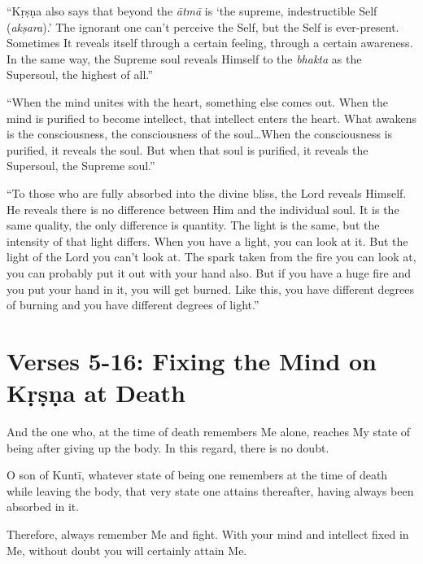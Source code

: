 \enquote{Kṛṣṇa also says that beyond the \textit{ātmā} is \enquote{the supreme, indestructible Self (\textit{akṣara}).} The ignorant one can’t perceive the Self, but the Self is ever-present. Sometimes It reveals itself through a certain feeling, through a certain awareness. In the same way, the Supreme soul reveals Himself to the \textit{bhakta} as the Supersoul, the highest of all.}

\enquote{When the mind unites with the heart, something else comes out. When the mind is purified to become intellect, that intellect enters the heart. What awakens is the consciousness, the consciousness of the soul\ldots When the consciousness is purified, it reveals the soul. But when that soul is purified, it reveals the Supersoul, the Supreme soul.}

\enquote{To those who are fully absorbed into the divine bliss, the Lord reveals Himself. He reveals there is no difference between Him and the individual soul. It is the same quality, the only difference is quantity. The light is the same, but the intensity of that light differs. When you have a light, you can look at it. But the light of the Lord you can’t look at. The spark taken from the fire you can look at, you can probably put it out with your hand also. But if you have a huge fire and you put your hand in it, you will get burned. Like this, you have different degrees of burning and you have different degrees of light.}

\section{Verses 5-16: Fixing the Mind on Kṛṣṇa at Death}\label{sec-verses-5-16-fixing-the-mind-on-krsna-at-death}

{And the one who, at the time of death remembers Me alone, reaches My state of being after giving up the body. In this regard, there is no doubt.}

{O son of Kuntī, whatever state of being one remembers at the time of death while leaving the body, that very state one attains thereafter, having always been absorbed in it.}

{Therefore, always remember Me and fight. With your mind and intellect fixed in Me, without doubt you will certainly attain Me.}

